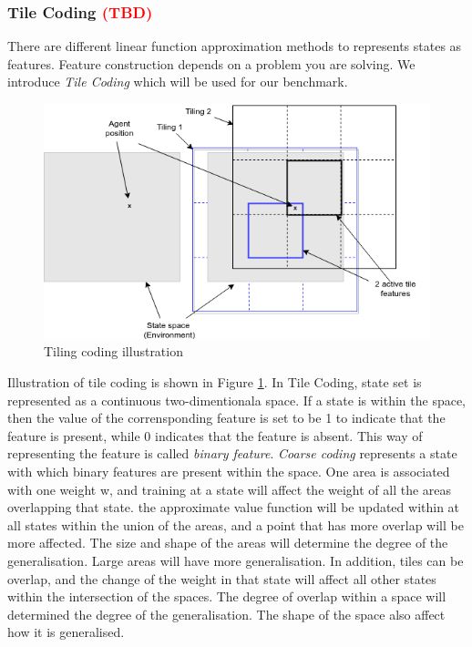 \documentclass[12pt,twoside]{report}
\theoremstyle{plain}
\theoremstyle{definition}
\begin{document}
\subsubsection{Tile Coding \textcolor{red}{(TBD)}}
There are different linear function approximation methods to represents states as features. Feature construction depends on a problem you are solving.  We introduce \textit{Tile Coding} which will be used for our benchmark.
\begin{figure}[!htb]
\centering
\includegraphics[width=1.0\textwidth]{./figures/tile_coding}
\caption{Tiling coding illustration}
\label{fig:tile_coding}
\end{figure}

Illustration of tile coding is shown in Figure \ref{fig:tile_coding}. In Tile Coding, state set is represented as a continuous two-dimentionala space. If a state is within the space, then the value of the  corrensponding feature is set to be 1 to indicate that the feature is present, while 0 indicates that the feature is absent. This way of representing the feature is called \textit{binary feature}.  \textit{Coarse coding} represents a state with which binary features are present within the space.
One area is associated with one weight w, and training at a state will affect the weight of all the areas overlapping that state. the approximate value function will be updated within at all states within the union of the areas, and a point that has more overlap will be more affected.
The size and shape of the areas will determine the degree of the generalisation. Large areas will have more generalisation. In addition, tiles can be overlap, and the change of the weight in that state will affect all other states within the intersection of the spaces. 
The degree of overlap within a space will determined the degree of the generalisation.
The shape of the space also affect how it is generalised.
\end{document}
